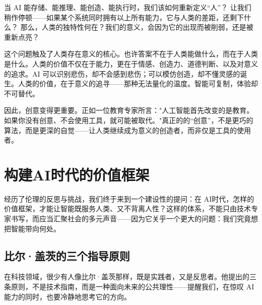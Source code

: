 当 AI 能存储、能推理、能创造、能执行时，我们该如何重新定义“人”？
让我们稍作停顿——如果某个系统同时拥有以上所有能力，它与人类的差距，还剩下什么？
那么，人类的独特性何在？我们的意义，会因为它的出现而被削弱，还是被重新点亮？

这个问题触及了人类存在意义的核心。也许答案不在于人类能做什么，而在于人类是什么。人类的价值不仅在于能力，更在于情感、创造力、道德判断、以及对意义的追求。AI 可以识别悲伤，却不会感到悲伤；可以模仿创造，却不懂灵感的诞生。人类的价值，在于意义的追寻——那种无法量化的温度。智能可复制，体验却不可替代。

因此，创意变得更重要。正如一位教育专家所言："人工智能首先改变的是教育。如果你没有创意、不会使用工具，就可能被取代。"真正的的“创意”，不是更巧的算法，而是更深的自觉——让人类继续成为意义的创造者，而非仅是工具的使用者。

\section{构建AI时代的价值框架}

经历了伦理的反思与挑战，我们终于来到一个建设性的提问：在 AI时代，怎样的价值框架，才能让智能既服务人类、又不背离人性？这样的体系，不能只由技术专家书写，而应当汇聚社会的多元声音——因为它关乎一个更大的问题：我们究竟想把智能带向何处。

\subsection{比尔·盖茨的三个指导原则}

在科技领域，很少有人像比尔·盖茨那样，既是实践者，又是反思者。他提出的三条原则，不是技术指南，而是一种面向未来的公共理性——提醒我们，在惊叹 AI 能力的同时，也要冷静地思考它的方向。

